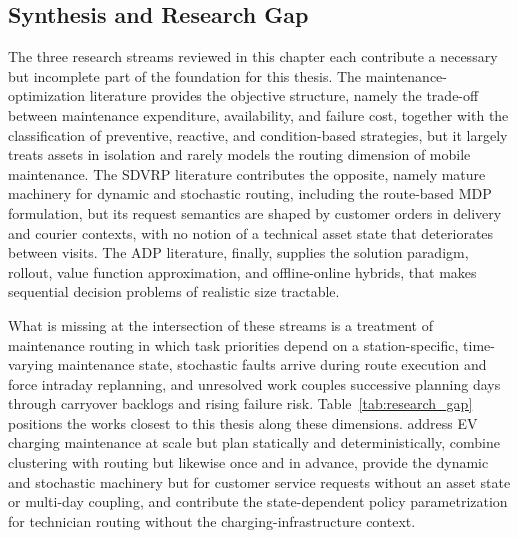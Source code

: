 \documentclass[12pt,oneside]{article}
\begin{document}
\subsection{Synthesis and Research Gap}\label{subsec_synthesis_and_research_gap}
The three research streams reviewed in this chapter each contribute a necessary but incomplete part of the foundation for this thesis. The maintenance-optimization literature provides the objective structure, namely the trade-off between maintenance expenditure, availability, and failure cost, together with the classification of preventive, reactive, and condition-based strategies, but it largely treats assets in isolation and rarely models the routing dimension of mobile maintenance. The SDVRP literature contributes the opposite, namely mature machinery for dynamic and stochastic routing, including the route-based MDP formulation, but its request semantics are shaped by customer orders in delivery and courier contexts, with no notion of a technical asset state that deteriorates between visits. The ADP literature, finally, supplies the solution paradigm, rollout, value function approximation, and offline-online hybrids, that makes sequential decision problems of realistic size tractable.

What is missing at the intersection of these streams is a treatment of maintenance routing in which task priorities depend on a station-specific, time-varying maintenance state, stochastic faults arrive during route execution and force intraday replanning, and unresolved work couples successive planning days through carryover backlogs and rising failure risk. Table~\ref{tab:research_gap} positions the works closest to this thesis along these dimensions. \citet{zhang2024routing} address EV charging maintenance at scale but plan statically and deterministically, \citet{yenigun2025smart} combine clustering with routing but likewise once and in advance, \citet{ulmer2019offline} provide the dynamic and stochastic machinery but for customer service requests without an asset state or multi-day coupling, and \citet{stein2025learning} contribute the state-dependent policy parametrization for technician routing without the charging-infrastructure context.
\end{document}
